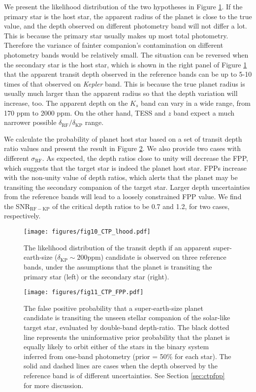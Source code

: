 \documentclass{aastex63}
\begin{document}
We present the likelihood distribution of the two hypotheses in Figure \ref{fig:ctp_lhood}. If the primary star is the host star, the apparent radius of the planet is close to the true value, and the depth observed on different photometry band will not differ a lot. This is because the primary star usually makes up most total photometry. Therefore the variance of fainter companion's contamination on different photometry bands would be relatively small. The situation can be reversed when the secondary star is the host star, which is shown in the right panel of Figure \ref{fig:ctp_lhood} that the apparent transit depth observed in the reference bands can be up to 5-10 times of that observed on \emph{Kepler} band. This is because the true planet radius is usually much larger than the apparent radius so that the depth variation will increase, too. The apparent depth on the $K_s$ band can vary in a wide range, from 170 ppm to 2000 ppm. On the other hand, TESS and $z$ band expect a much narrower possible $\delta_\mathrm{RF}/\delta_\mathrm{KP}$ range. 

We calculate the probability of planet host star based on a set of transit depth ratio values and present the result in Figure \ref{fig:ctp_fpp}. We also provide two cases with different $\sigma_\mathrm{RF}$. As expected, the depth ratios close to unity will decrease the FPP, which suggests that the target star is indeed the planet host star. FPPs increase with the non-unity value of depth ratios, which alerts that the planet may be transiting the secondary companion of the target star. Larger depth uncertainties from the reference bands will lead to a loosely constrained FPP value. We find the SNR$_\mathrm{RF-KP}$ of the critical depth ratios to be 0.7 and 1.2, for two cases, respectively. 


\begin{figure}[ht]
    \centering
    \texttt{[image: figures/fig10\_CTP\_lhood.pdf]}
    \caption{The likelihood distribution of the transit depth if an apparent super-earth-size ($\delta_\mathrm{KP} \sim 200$ppm) candidate is observed on three reference bands, under the assumptions that the planet is transiting the primary star (left) or the secondary star (right).  }
    \label{fig:ctp_lhood}
\end{figure}

 \begin{figure}[ht]
    \centering
    \texttt{[image: figures/fig11\_CTP\_FPP.pdf]}
    \caption{The false positive probability that a super-earth-size planet candidate is transiting the unseen stellar companion of the solar-like target star, evaluated by double-band depth-ratio. The black dotted line represents the uninformative prior probability that the planet is equally likely to orbit either of the stars in the binary system inferred from one-band photometry (prior = 50\% for each star). The solid and dashed lines are cases when the depth observed by the reference band is of different uncertainties. See Section \ref{sec:ctpfpp} for more discussion.}
    \label{fig:ctp_fpp}
\end{figure}
\end{document}
